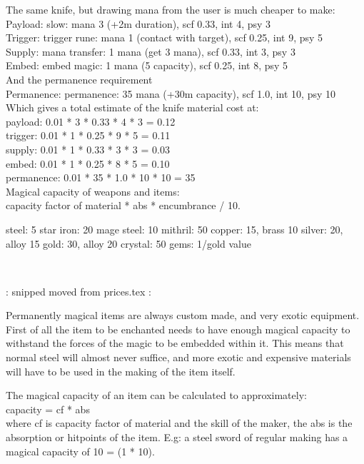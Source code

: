 The same knife, but drawing mana from the user is much cheaper to make: \\
Payload: slow: mana 3 (+2m duration), scf 0.33, int 4, psy 3 \\
Trigger: trigger rune: mana 1 (contact with target), scf 0.25, int 9, psy 5 \\
Supply: mana transfer: 1 mana (get 3 mana), scf 0.33, int 3, psy 3 \\
Embed: embed magic: 1 mana (5 capacity), scf 0.25, int 8, psy 5 \\
And the permanence requirement \\
Permanence: permanence: 35 mana (+30m capacity), scf 1.0, int 10, psy 10 \\
Which gives a total estimate of the knife material cost at: \\
payload: 0.01 * 3 * 0.33 * 4 * 3 = 0.12 \\
trigger: 0.01 * 1 * 0.25 * 9 * 5 = 0.11 \\
supply: 0.01 * 1 * 0.33 * 3 * 3 = 0.03 \\
embed: 0.01 * 1 * 0.25 * 8 * 5 = 0.10 \\
permanence: 0.01 * 35 * 1.0 * 10 * 10 = 35 \\



Magical capacity of weapons and items:\\
capacity factor of material * abs * encumbrance / 10.

steel:       5
star iron:  20
mage steel: 10
mithril:    50
copper:     15, brass 10
silver:     20, alloy 15
gold:       30, alloy 20
crystal:    50
gems:       1/gold value



\

\TODO: snipped moved from prices.tex :

Permanently magical items are always custom made, and very exotic equipment.
First of all the item to be enchanted needs to have enough magical capacity to withstand the forces of the magic to be embedded within it. This means that normal steel will almost never suffice, and more exotic and expensive materials will have to be used in the making of the item itself.

The magical capacity of an item can be calculated to approximately: \\
capacity = cf * abs \\
where cf is capacity factor of material and the skill of the maker, the abs is the absorption or hitpoints of the item.
E.g: a steel sword of regular making has a magical capacity of 10 = (1 * 10).

